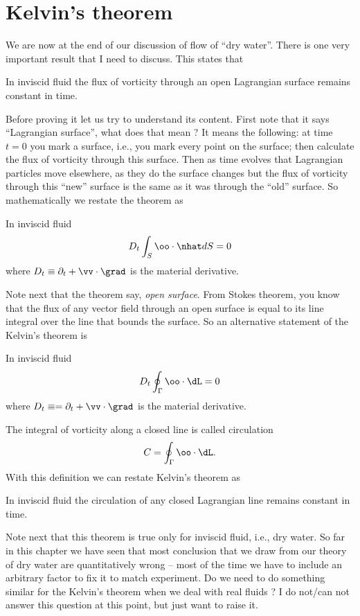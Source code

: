 \section{Kelvin's theorem}
We are now at the end of our discussion of flow of ``dry water''. 
There is one very important result that I need to discuss. This states
that
\begin{thm-non}
In inviscid fluid the flux of vorticity through an open Lagrangian surface
remains constant in time.
\end{thm-non}
Before proving it let us try to understand its content. First note
that it says ``Lagrangian surface'', what does that mean ? It means
the following:  at time $t=0$ you mark a surface, i.e., you mark every
point on the surface; then calculate the flux of vorticity through
this surface.  Then as time evolves that Lagrangian particles move
elsewhere, as they do the surface changes but the flux of vorticity
through this ``new'' surface is the same as it was through the ``old''
surface. So mathematically we restate the theorem as 
\begin{thm-non}
In inviscid fluid 
\begin{equation}
D_t \int_S \oo\cdot\nhat dS = 0 
\label{A2.2:Kelvin}
\end{equation}
where $D_t \equiv  \partial_t + \vv\cdot\grad$ is the material
derivative. 
\end{thm-non}
 Note next that the theorem say, \textit{open surface}. From Stokes
theorem, you know that the flux of any vector field through an open
surface is equal to its line integral over the line that bounds the
surface. So an alternative statement of the Kelvin's theorem is 
\begin{thm-non}
In inviscid fluid
\begin{equation}
D_t \oint_{\Gamma} \oo\cdot\dL = 0 
\end{equation}
where $D_t \equiv = \partial_t + \vv\cdot\grad$ is the material
derivative.  
\end{thm-non}
The integral of vorticity along a closed line is called circulation
\begin{equation}
 C = \oint_{\Gamma} \oo\cdot\dL \/.
\end{equation}
With this definition we can restate Kelvin's theorem as 
\begin{thm-non}
In inviscid fluid the circulation of any closed Lagrangian
line remains constant in time. 
\end{thm-non}
Note next that this theorem is true only for inviscid fluid, i.e., dry
water. So far in this chapter we have seen that most conclusion that
we draw from our theory of dry water are quantitatively wrong -- most
of the time we have to include an arbitrary factor to fix it to match
experiment. Do we need to do something similar for the Kelvin's
theorem when we deal with real fluids ? I do not/can not answer this
question at this point, but just want to raise it. 
